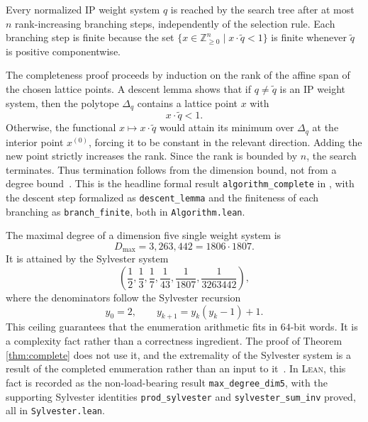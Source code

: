 \documentclass[appliedmath,article,submit,moreauthors]{Definitions/mdpi}
\newcommand{\Z}{\mathbb{Z}}
\newcommand{\Lean}{\textsc{Lean}}
\newcommand{\Dq}{\Delta_q}
\begin{document}
\begin{Theorem}
\label{thm:complete}
Every normalized IP weight system \(q\) is reached by the search tree after at
most \(n\) rank-increasing branching steps, independently of the selection rule.
Each branching step is finite because the set \(\{x\in\Z_{\geq0}^n\mid
x\cdot\widetilde q<1\}\) is finite whenever \(\widetilde q\) is positive
componentwise.
\end{Theorem}

The completeness proof proceeds by induction on the rank of the affine span of
the chosen lattice points.  A descent lemma shows that if \(q\neq\widetilde q\)
is an IP weight system, then the polytope \(\Dq\) contains a lattice point \(x\)
with
\[
        x\cdot\widetilde q<1.
\]
Otherwise, the functional \(x\mapsto x\cdot\widetilde q\) would attain its
minimum over \(\Dq\) at the interior point \(x^{(0)}\), forcing it to be
constant in the relevant direction.  Adding the new point strictly increases the
rank.  Since the rank is bounded by \(n\), the search terminates.  Thus
termination follows from the dimension bound, not from a degree
bound~\cite{Skarke1996,Scholler2019}.  This is the headline formal result
\nolinkurl{algorithm\_complete} in , with the
descent step formalized as \nolinkurl{descent\_lemma} and the finiteness of each
branching as \nolinkurl{branch\_finite}, both in \nolinkurl{Algorithm.lean}.

\begin{Remark}
\label{rmk:sylvester}
The maximal degree of a dimension five single weight system is
\[
        D_{\max}
        =
        3{,}263{,}442
        =
        1806\cdot 1807.
\]
It is attained by the Sylvester system
\[
        \left(
        \frac12,
        \frac13,
        \frac17,
        \frac1{43},
        \frac1{1807},
        \frac1{3263442}
        \right),
\]
where the denominators follow the Sylvester recursion
\[
        y_0=2,
        \qquad
        y_{k+1}=y_k(y_k-1)+1.
\]
This ceiling guarantees that the enumeration arithmetic fits in \(64\)-bit
words.  It is a complexity fact rather than a correctness ingredient.  The proof
of Theorem \ref{thm:complete} does not use it, and the extremality of the Sylvester
system is a result of the completed enumeration rather than an input to
it~\cite{Scholler2019}.  In \Lean, this fact is recorded as the non-load-bearing
result \nolinkurl{max\_degree\_dim5}, with the supporting Sylvester identities
\nolinkurl{prod\_sylvester} and \nolinkurl{sylvester\_sum\_inv} proved, all in
\nolinkurl{Sylvester.lean}.
\end{Remark}
\end{document}
